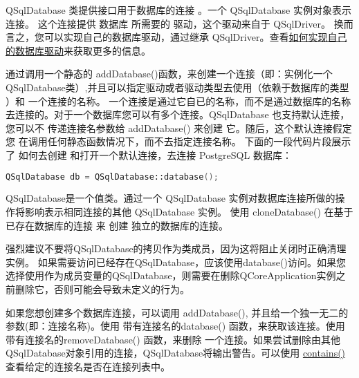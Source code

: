 QSqlDatabase 类提供接口用于数据库的连接 。一个 QSqlDatabase 实例对象表示连接。 这个连接提供 数据库 所需要的 驱动，这个驱动来自于 QSqlDriver。 换而言之，您可以实现自己的数据库驱动，通过继承 QSqlDriver。查看\href{https://doc.qt.io/qt-5/sql-driver.html#how-to-write-your-own-database-driver}{如何实现自己的数据库驱动}来获取更多的信息。

通过调用一个静态的 addDatabase()函数，来创建一个连接（即：实例化一个QSqlDatabase类）,并且可以指定驱动或者驱动类型去使用（依赖于数据库的类型 ）和 一个连接的名称。 一个连接是通过它自已的名称，而不是通过数据库的名称去连接的。对于一个数据库您可以有多个连接。QSqlDatabase 也支持默认连接，您可以不 传递连接名参数给 addDatabase() 来创建 它。随后，这个默认连接假定您 在调用任何静态函数情况下，而不去指定连接名称。 下面的一段代码片段展示了 如何去创建 和打开一个默认连接，去连接 PostgreSQL 数据库：

\begin{lstlisting}[language=C++]
QSqlDatabase db = QSqlDatabase::database();
\end{lstlisting}

QSqlDatabase是一个值类。通过一个 QSqlDatabase 实例对数据库连接所做的操作将影响表示相同连接的其他 QSqlDatabase 实例。 使用 cloneDatabase() 在基于已存在数据库的连接 来 创建 独立的数据库的连接。

\begin{notice}[警告]
强烈建议不要将QSqlDatabase的拷贝作为类成员，因为这将阻止关闭时正确清理实例。 如果需要访问已经存在QSqlDatabase，应该使用database()访问。如果您选择使用作为成员变量的QSqlDatabase，则需要在删除QCoreApplication实例之前删除它，否则可能会导致未定义的行为。
\end{notice}

如果您想创建多个数据库连接，可以调用 addDatabase(), 并且给一个独一无二的参数(即：连接名称)。使用 带有连接名的database() 函数，来获取该连接。使用 带有连接名的removeDatabase() 函数，来删除 一个连接。如果尝试删除由其他QSqlDatabase对象引用的连接，QSqlDatabase将输出警告。可以使用 \href{https://github.com/QtDocumentCN/QtDocumentCN/blob/master/Src/S/QSqlDatabase/QSqlDatabase.md#static-bool-qsqldatabasecontainsconst-qstring-connectionname--qlatin1stringdefaultconnection}{contains()}查看给定的连接名是否在连接列表中。


